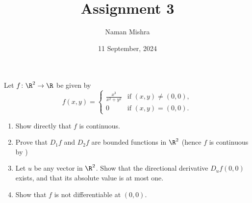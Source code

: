 \documentclass[12pt]{article}
\title{Assignment 3}
\author{Naman Mishra}
\date{11 September, 2024}
\begin{document}
\maketitle

\setcounter{problem}{4}
\begin{problem}
    Let $f\colon \R^2 \to \R$ be given by \[
        f(x, y) = \begin{cases}
            \frac{x^3}{x^2 + y^2} & \text{if } (x, y) \ne (0, 0), \\
            0 & \text{if } (x, y) = (0, 0).
        \end{cases}
    \]
    \begin{enumerate}
        \item Show directly that $f$ is continuous.
        \item Prove that $D_1f$ and $D_2f$ are bounded functions in
        $\R^2$ (hence $f$ is continuous by
        )
        \item Let $u$ be any vector in $\R^2$.
        Show that the directional derivative $D_uf(0, 0)$ exists, and that
        its absolute value is at most one.
        \item Show that $f$ is not differentiable at $(0, 0)$.
    \end{enumerate}
\end{problem}
\end{document}
